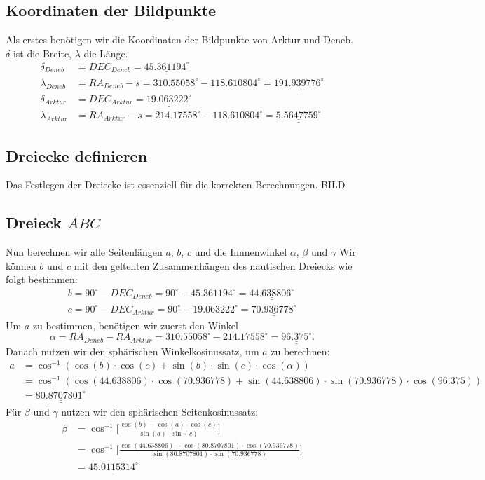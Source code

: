 \subsection{Koordinaten der Bildpunkte}
Als erstes benötigen wir die Koordinaten der Bildpunkte von Arktur und Deneb. 
$\delta$ ist die Breite, $\lambda$ die Länge.
\begin{align}
\delta_{Deneb}&=DEC_{Deneb} = \underline{\underline{45.361194^\circ}} \nonumber \\ 
\lambda_{Deneb}&=RA_{Deneb} - s = 310.55058^\circ -118.610804^\circ =\underline{\underline{191.939776^\circ}}   \nonumber \\ 
\delta_{Arktur}&=DEC_{Arktur} =  \underline{\underline{19.063222^\circ}} \nonumber \\ 
\lambda_{Arktur}&=RA_{Arktur} - s = 214.17558^\circ -118.610804^\circ = \underline{\underline{5.5647759^\circ}}  \nonumber  
\end{align}


\subsection{Dreiecke definieren}
Das Festlegen der Dreiecke ist essenziell für die korrekten Berechnungen.
BILD
\subsection{Dreieck $ABC$}
Nun berechnen wir alle Seitenlängen $a$, $b$, $c$ und die Innnenwinkel $\alpha$, $\beta$ und $\gamma$
Wir können $b$ und $c$ mit den geltenten Zusammenhängen des nautischen Dreiecks wie folgt bestimmen:
\begin{align}
	b=90^\circ-DEC_{Deneb} = 90^\circ - 45.361194^\circ = \underline{\underline{44.638806^\circ}}\nonumber \\
	c=90^\circ-DEC_{Arktur} = 90^\circ - 19.063222^\circ = \underline{\underline{70.936778^\circ}} \nonumber 
\end{align}
Um $a$ zu bestimmen, benötigen wir zuerst den Winkel \[\alpha= RA_{Deneb} - RA_{Arktur} = 310.55058^\circ -214.17558^\circ = \underline{\underline{96.375^\circ}}.\]
Danach nutzen wir den sphärischen Winkelkosinussatz, um  $a$ zu berechnen:
\begin{align}
	a &= \cos^{-1}(\cos(b) \cdot \cos(c) + \sin(b) \cdot \sin(c) \cdot \cos(\alpha)) \nonumber \\
	 &= \cos^{-1}(\cos(44.638806) \cdot \cos(70.936778) + \sin(44.638806) \cdot \sin(70.936778) \cdot \cos(96.375)) \nonumber \\
	 &= \underline{\underline{80.8707801^\circ}} \nonumber
\end{align}
Für $\beta$ und $\gamma$ nutzen wir den sphärischen Seitenkosinussatz:
\begin{align}
	\beta &= \cos^{-1}  \bigg[\frac{\cos(b)-\cos(a) \cdot \cos(c)}{\sin(a) \cdot \sin(c)}\bigg] \nonumber \\
	&= \cos^{-1}  \bigg[\frac{\cos(44.638806)-\cos(80.8707801) \cdot \cos(70.936778)}{\sin(80.8707801) \cdot \sin(70.936778)}\bigg] \nonumber \\
	&= \underline{\underline{45.0115314^\circ}} \nonumber
\end{align}

